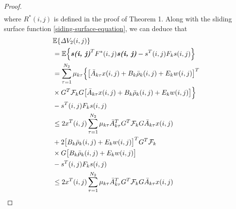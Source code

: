 \documentclass[journal,final,twocolumn]{IEEEtran}
\begin{document}
\begin{proof}
\begin{equation}
\begin{split}
		\end{split}
	\end{equation}
	where $R^{*}(i,j)$ is defined in the proof of Theorem 1.  
	Along with the sliding surface function \eqref{siding-surface-equation}, we can deduce that
	\begin{equation} \label{P2T2}
		\begin{split}
			&\mathbb{E}\{\varDelta V_{2}(i,j) \}\\
			&=\mathbb{E}\Big\{\emph{\textbf{s(i, j)}}^{T}F^{*}(i,j)\emph{\textbf{s(i, j)}} - s^{T}(i,j)F_{k}s(i,j)\Big\}\\
			&=  \sum_{\tau =1}^{N_{2}}\mu_{k\tau }\Big\{\big[\bar{A}_{k\tau }x(i,j)+B_{k}\bar{\rho}_{k}(i,j)+E_{k}w(i,j)\big]^{T}\\
			&\times G^{T}\mathcal{F}_{k} G\big[ \bar{A}_{k\tau }x(i,j)+B_{k}\bar{\rho}_{k}(i,j)+E_{k}w(i,j)\big]\Big\}\\
			&-s^{T}(i,j)F_{k}s(i,j)\\
			&\leq 2x^{T}(i,j)\sum_{\tau =1}^{N_{2}}\mu_{k\tau }\bar{A}^{T}_{k\tau }G^{T}\mathcal{F}_{k}G\bar{A}_{k\tau }x(i,j) \\
			&+2\big[B_{k}\bar{\rho}_{k}(i,j)+E_{k}w(i,j)\big]^{T}G^{T}\mathcal{F}_{k}\\
			&\times G\big[B_{k}\bar{\rho}_{k}(i,j)+E_{k}w(i,j)\big]\\
			&-s^{T}(i,j)F_{k}s(i,j)\\
			&\leq 2x^{T}(i,j)\sum_{\tau =1}^{N_{2}}\mu_{k\tau }\bar{A}^{T}_{k\tau }G^{T}\mathcal{F}_{k}G\bar{A}_{k\tau }x(i,j) \\

\end{split}
\end{equation}
\end{proof}
\end{document}
